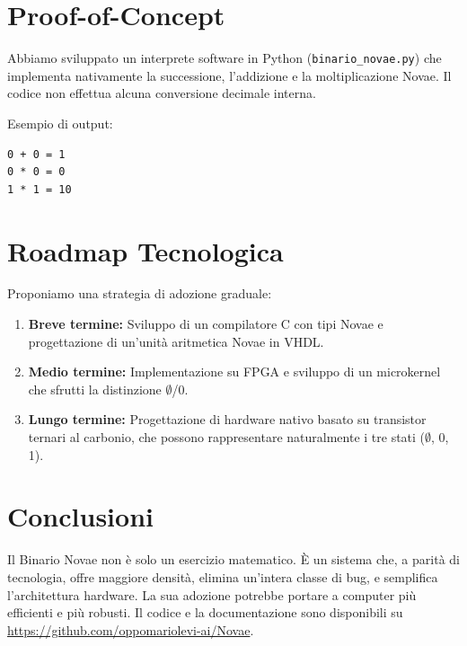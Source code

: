 \documentclass[11pt,a4paper,oneside]{article}
\begin{document}
\section{Proof-of-Concept}
Abbiamo sviluppato un interprete software in Python (\texttt{binario\_novae.py}) che implementa nativamente la successione, l'addizione e la moltiplicazione Novae. Il codice non effettua alcuna conversione decimale interna.

Esempio di output:
\begin{verbatim}
0 + 0 = 1
0 * 0 = 0
1 * 1 = 10
\end{verbatim}

\section{Roadmap Tecnologica}
Proponiamo una strategia di adozione graduale:
\begin{enumerate}
\item \textbf{Breve termine:} Sviluppo di un compilatore C con tipi Novae e progettazione di un'unità aritmetica Novae in VHDL.
\item \textbf{Medio termine:} Implementazione su FPGA e sviluppo di un microkernel che sfrutti la distinzione $\emptyset$/0.
\item \textbf{Lungo termine:} Progettazione di hardware nativo basato su transistor ternari al carbonio, che possono rappresentare naturalmente i tre stati ($\emptyset$, 0, 1).
\end{enumerate}

\section{Conclusioni}
Il Binario Novae non è solo un esercizio matematico. È un sistema che, a parità di tecnologia, offre maggiore densità, elimina un'intera classe di bug, e semplifica l'architettura hardware. La sua adozione potrebbe portare a computer più efficienti e più robusti. Il codice e la documentazione sono disponibili su \url{https://github.com/oppomariolevi-ai/Novae}.
\end{document}

